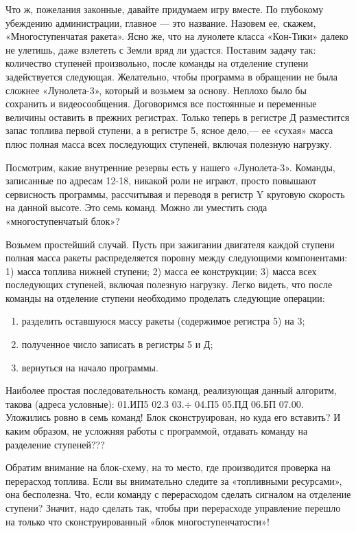 \documentclass[11pt,a4paper,oneside]{article}
\begin{document}
Что ж, пожелания законные, давайте придумаем игру вместе. По глубокому убеждению администрации, главное — это название. Назовем ее, скажем, «Многоступенчатая ракета». Ясно же, что на лунолете класса «Кон-Тики» далеко не улетишь, даже взлететь с Земли вряд ли удастся. Поставим задачу так: количество ступеней произвольно, после команды на отделение ступени задействуется следующая. Желательно, чтобы программа в обращении не была сложнее «Лунолета-3», который и возьмем за основу. Неплохо было бы сохранить и видеосообщения. Договоримся все постоянные и переменные величины оставить в прежних регистрах. Только теперь в регистре Д разместится запас топлива первой ступени, а в регистре 5, ясное дело,— ее «сухая» масса плюс полная масса всех последующих ступеней, включая полезную нагрузку.

Посмотрим, какие внутренние резервы есть у нашего «Лунолета-3». Команды, записанные по адресам 12-18, никакой роли не играют, просто повышают сервисность программы, рассчитывая и переводя в регистр Y круговую скорость на данной высоте. Это семь команд. Можно ли уместить сюда «многоступенчатый блок»?

Возьмем простейший случай. Пусть при зажигании двигателя каждой ступени полная масса ракеты распределяется поровну между следующими компонентами: 1) масса топлива нижней ступени; 2) масса ее конструкции; 3) масса всех последующих ступеней, включая полезную нагрузку. Легко видеть, что после команды на отделение ступени необходимо проделать следующие операции:

\begin{enumerate}
\item разделить оставшуюся массу ракеты (содержимое регистра 5) на 3;
\item полученное число записать в регистры 5 и Д;
\item вернуться на начало программы.
\end{enumerate}

Наиболее простая последовательность команд, реализующая данный алгоритм, такова (адреса условные): 01.ИП5 02.3 03.$\div$ 04.П5 05.ПД 06.БП 07.00. Уложились ровно в семь команд! Блок сконструирован, но куда его вставить? И каким образом, не усложняя работы с программой, отдавать команду на разделение ступеней???

Обратим внимание на блок-схему, на то место, где производится проверка на перерасход топлива. Если вы внимательно следите за «топливными ресурсами», она бесполезна. Что, если команду с перерасходом сделать сигналом на отделение ступени? Значит, надо сделать так, чтобы при перерасходе управление перешло на только что сконструированный «блок многоступенчатости»!
\end{document}
